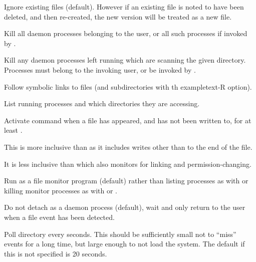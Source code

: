 
Ignore existing files (default). However if an existing file is noted to have been deleted, and then re-created, the new version
will be treated as a new file.


Kill all \PrBtfilemon{} daemon processes belonging to the user, or all such processes if invoked by .


Kill any \PrBtfilemon{} daemon processes left running which are scanning the given directory. Processes must
belong to the invoking user, or \PrBtfilemon{} be invoked by .


Follow symbolic links to files (and subdirectories with th exampletext{{}-R} option).


List running \PrBtfilemon{} processes and which directories they are accessing.


Activate command when a file has appeared, and has not been written to, for at least .

This is more inclusive than  as it includes writes other than to the end of the file.

It is less inclusive than  which also monitors for linking and permission-changing.


Run as a file monitor program (default) rather than listing processes as with  or killing monitor processes
as with  or .


Do not detach \PrBtfilemon{} as a daemon process (default), wait and only return to the user when a file event has been detected.


Poll directory every  seconds. This should be sufficiently small not to ``miss'' events for
a long time, but large enough to not load the system. The default if this is not specified is 20 seconds.

